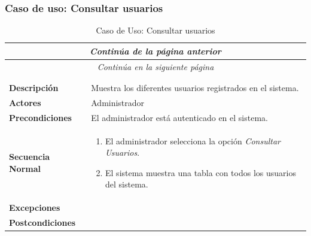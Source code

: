 \newpage
\subsubsection*{Caso de uso: Consultar usuarios }
\begin{longtable}{| p{4cm} | p{10cm} |}
\endfirsthead
\multicolumn{2}{c}{\textit{Continúa de la página anterior}}\\[12pt]
\hline
\endhead
\hline
\multicolumn{2}{c}{\textit{Continúa en la siguiente página}} \\
\endfoot
\hline
\caption{Caso de Uso: Consultar usuarios}\label{fig:1}\\
\endlastfoot


\hline
\multicolumn{2}{|c|}{\textbf{CU$<$22$>$ - Consultar Usuarios}} \\

\hline
\textbf{Descripción} &
Muestra los diferentes usuarios registrados en el sistema.\\

\hline
\textbf{Actores} &
Administrador\\

\hline
\textbf{Precondiciones} &
El administrador está autenticado en el sistema.\\

\hline
\textbf{Secuencia Normal} &\mbox{}\par\vspace{-\baselineskip}
\begin{enumerate}[leftmargin=0.7cm, topsep=0.1cm]
\item El administrador selecciona la opción \textit{Consultar Usuarios}.
\item El sistema muestra una tabla con todos los usuarios del sistema.
\end{enumerate}


\\
\hline
\textbf{Excepciones} &\mbox{}\par\vspace{-\baselineskip}
\\

\hline
\textbf{Postcondiciones} & \\
\hline
\end{longtable}



\newpage
